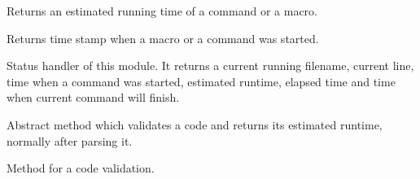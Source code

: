 \documentclass[letterpaper,10pt,english]{sphinxmanual}
\begin{document}
\begin{fulllineitems}
\begin{fulllineitems}
\end{fulllineitems}


\begin{fulllineitems}
\label{sysmod:pyfrid.modules.system.vm.core.vm.BaseVMModule.runtime}
Returns an estimated running time of a command or a macro.

\end{fulllineitems}


\begin{fulllineitems}
\label{sysmod:pyfrid.modules.system.vm.core.vm.BaseVMModule.started}
Returns time stamp when a macro or a command was started.

\end{fulllineitems}


\begin{fulllineitems}
\label{sysmod:pyfrid.modules.system.vm.core.vm.BaseVMModule.status}
Status handler of this module. It returns a current running filename, current line, 
time when a command was started, estimated runtime, elapsed time and time when current command 
will finish.

\end{fulllineitems}


\begin{fulllineitems}
\label{sysmod:pyfrid.modules.system.vm.core.vm.BaseVMModule.validate_ast}
Abstract method which validates a code and returns its estimated runtime, normally after parsing it.

\end{fulllineitems}


\begin{fulllineitems}
\label{sysmod:pyfrid.modules.system.vm.core.vm.BaseVMModule.validate_code}
Method for a code validation.

\end{fulllineitems}


\end{fulllineitems}
\end{document}
